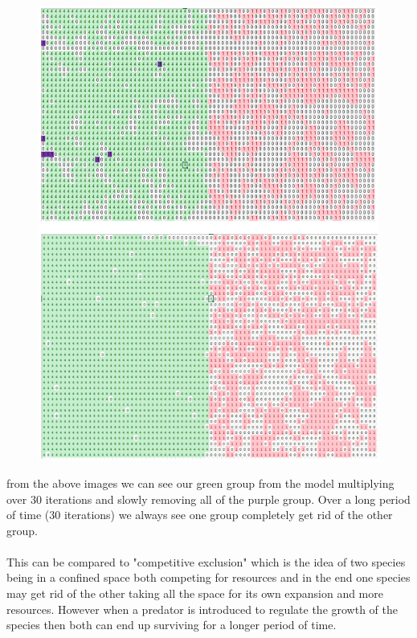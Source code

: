 \documentclass[11pt]{article}
\begin{document}
\begin{figure}[H]
	\includegraphics[width=\linewidth]{ethnic_cleanse5.png}
	\caption{}
	\label{fig:frenchriot}
\end{figure}
from the above images we can see our green group from the model multiplying over 30 iterations and slowly removing all of the purple group. Over a long period of time (30 iterations) we always see one group completely get rid of the other group.\\
\\
This can be compared to "competitive exclusion" which is the idea of two species being in a confined space both competing for resources and in the end one species may get rid of the other taking all the space for its own expansion and more resources. However when a predator is introduced to regulate the growth of the species then both can end up surviving for a longer period of time.
\end{document}
